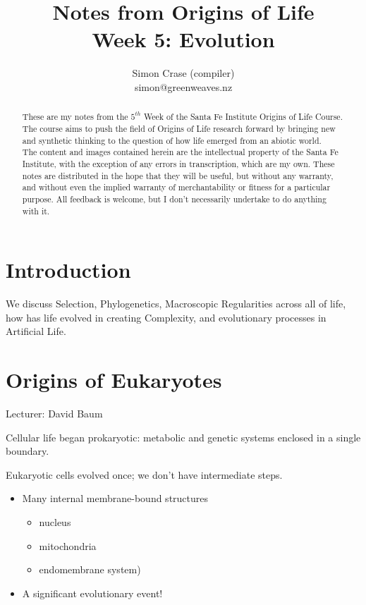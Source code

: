 \documentclass[]{article}
\title{
	Notes from Origins of Life\\
	Week 5: Evolution}
\author{Simon Crase (compiler)\\simon@greenweaves.nz}
\begin{document}
\maketitle

\begin{abstract}
   These are my notes from the $5^{th}$ Week of the Santa Fe Institute Origins of Life Course\cite{sfi2020}. The course aims to push the field of Origins of Life research forward by bringing new and synthetic thinking to the question of how life emerged from an abiotic world.\\
   The content and images contained herein are the intellectual property of the Santa Fe Institute, with the exception of any errors in transcription, which are my own.
   These notes are distributed in the hope that they will be useful,
   but without any warranty, and without even the implied warranty of
   merchantability or fitness for a particular purpose. All feedback is welcome,
   but I don't necessarily undertake to do anything with it.
\end{abstract}

\setcounter{tocdepth}{2}
\tableofcontents
\listoffigures

\section{Introduction}

We discuss Selection, Phylogenetics, Macroscopic Regularities across all of life, how has life evolved in creating Complexity, and evolutionary processes in Artificial Life. 

\section{Origins of Eukaryotes}

Lecturer: David Baum

Cellular life began prokaryotic: metabolic and genetic systems enclosed in a single
boundary.

Eukaryotic cells evolved once; we don't have intermediate steps.

\begin{itemize}
	\item Many internal membrane-bound structures
	\begin{itemize}
		\item nucleus
		\item mitochondria
		\item endomembrane system)
	\end{itemize}
	\item A significant evolutionary event!
\end{itemize}
\end{document}
